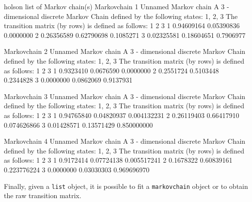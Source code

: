 \documentclass[
  nojss]{jss}
\begin{document}
\begin{CodeChunk}


\begin{CodeOutput}
holson  list of Markov chain(s) 
Markovchain  1 
Unnamed Markov chain 
 A  3 - dimensional discrete Markov Chain defined by the following states: 
 1, 2, 3 
 The transition matrix  (by rows)  is defined as follows: 
           1          2         3
1 0.94609164 0.05390836 0.0000000
2 0.26356589 0.62790698 0.1085271
3 0.02325581 0.18604651 0.7906977

Markovchain  2 
Unnamed Markov chain 
 A  3 - dimensional discrete Markov Chain defined by the following states: 
 1, 2, 3 
 The transition matrix  (by rows)  is defined as follows: 
          1         2         3
1 0.9323410 0.0676590 0.0000000
2 0.2551724 0.5103448 0.2344828
3 0.0000000 0.0862069 0.9137931

Markovchain  3 
Unnamed Markov chain 
 A  3 - dimensional discrete Markov Chain defined by the following states: 
 1, 2, 3 
 The transition matrix  (by rows)  is defined as follows: 
           1          2           3
1 0.94765840 0.04820937 0.004132231
2 0.26119403 0.66417910 0.074626866
3 0.01428571 0.13571429 0.850000000

Markovchain  4 
Unnamed Markov chain 
 A  3 - dimensional discrete Markov Chain defined by the following states: 
 1, 2, 3 
 The transition matrix  (by rows)  is defined as follows: 
          1          2           3
1 0.9172414 0.07724138 0.005517241
2 0.1678322 0.60839161 0.223776224
3 0.0000000 0.03030303 0.969696970
\end{CodeOutput}
\end{CodeChunk}

Finally, given a \texttt{list} object, it is possible to fit a \texttt{markovchain} object or to obtain the raw transition matrix.
\end{document}
